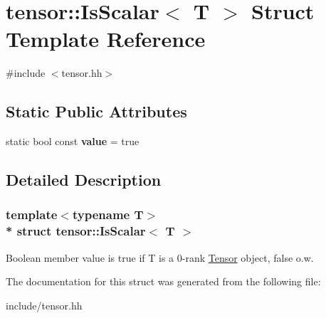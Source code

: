 \hypertarget{structtensor_1_1IsScalar}{}\section{tensor\+:\+:Is\+Scalar$<$ T $>$ Struct Template Reference}
\label{structtensor_1_1IsScalar}


{\ttfamily \#include $<$tensor.\+hh$>$}

\subsection*{Static Public Attributes}
\begin{DoxyCompactItemize}
\item 
static bool const {\bfseries value} = true\hypertarget{structtensor_1_1IsScalar_a9b1bd559be5d847beca462c1c497d999}{}\label{structtensor_1_1IsScalar_a9b1bd559be5d847beca462c1c497d999}

\end{DoxyCompactItemize}


\subsection{Detailed Description}
\subsubsection*{template$<$typename T$>$\\*
struct tensor\+::\+Is\+Scalar$<$ T $>$}

Boolean member {\ttfamily value} is true if T is a 0-\/rank \hyperlink{classtensor_1_1Tensor}{Tensor} object, false o.\+w. 

The documentation for this struct was generated from the following file\+:\begin{DoxyCompactItemize}
\item 
include/tensor.\+hh\end{DoxyCompactItemize}
